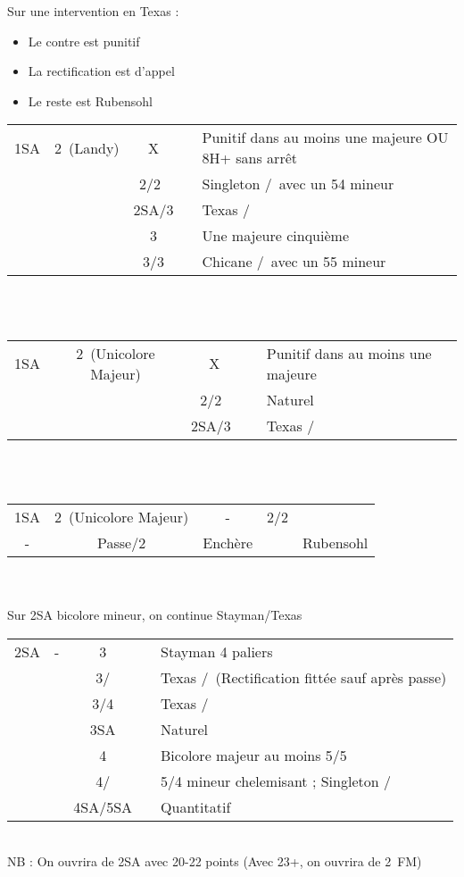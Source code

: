 \documentclass[a4paper, oneside, 11pt]{report}
\begin{document}
		Sur une intervention en Texas :
		\begin{itemize}
		\item Le contre est punitif
		\item La rectification est d'appel
		\item Le reste est Rubensohl\\
		\end{itemize}
		
		\begin{tabular}{cccc|l}
		1SA & 2\trefle\ (Landy) & X && Punitif dans au moins une majeure OU 8H+ sans arrêt\\
		&& 2\coeur/2\pique\ && Singleton \pique/\coeur\ avec un 54 mineur\\
		&& 2SA/3\trefle && Texas \trefle/\carreau\\
		&& 3\carreau && Une majeure cinquième\\
		&& 3\coeur/3\pique && Chicane \pique/\coeur\ avec un 55 mineur\\
		\end{tabular}\\\\
		
		\begin{tabular}{cccc|l}
		1SA & 2\carreau\ (Unicolore Majeur) & X && Punitif dans au moins une majeure\\
		&& 2\coeur/2\pique\ && Naturel\\
		&& 2SA/3\trefle\ && Texas \trefle/\carreau\\
		\end{tabular}\\\\
		
		\begin{tabular}{cccc|l}
		1SA & 2\carreau\ (Unicolore Majeur) & - & 2\coeur/2\pique &\\
		- & Passe/2\pique & Enchère && Rubensohl\\
		\end{tabular}\\\\

		Sur 2SA bicolore mineur, on continue Stayman/Texas\\
	
	\begin{tabular}{cccc|l}
	2SA & - & 3\trefle && Stayman 4 paliers\\
	&& 3\carreau/\coeur && Texas \coeur/\pique\ (Rectification fittée sauf après passe)\\
	&& 3\pique/4\trefle && Texas \trefle/\carreau\\
	&& 3SA && Naturel\\
	&& 4\carreau && Bicolore majeur au moins 5/5\\
	&& 4\coeur/\pique && 5/4 mineur chelemisant ; Singleton \pique/\coeur\\
	&& 4SA/5SA && Quantitatif\\
	\end{tabular}\\
	NB : On ouvrira de 2SA avec 20-22 points (Avec 23+, on ouvrira de 2\trefle\ FM)\\
\end{document}
